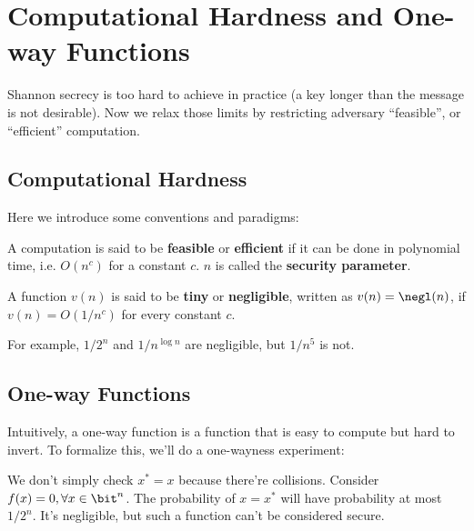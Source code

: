 \chapter{Computational Hardness and One-way Functions}

Shannon secrecy is too hard to achieve in practice (a key longer than the message is not desirable). Now we relax those limits by restricting adversary ``feasible'', or ``efficient'' computation.

\section{Computational Hardness}

Here we introduce some conventions and paradigms:

\begin{definition}
	A computation is said to be \textbf{feasible} or \textbf{efficient} if it can be done in polynomial time, i.e. $O(n^c)$ for a constant $c$.
	$n$ is called the \textbf{security parameter}.
\end{definition}

\begin{definition}
	A function $v(n)$ is said to be \textbf{tiny} or \textbf{negligible}, written as $v(n) = \negl(n)$, if $v(n) = O(1/n^c)$ for every constant $c$.
\end{definition}

For example, $1/2^n$ and $1/n^{\log n}$ are negligible, but $1/n^5$ is not.

\section{One-way Functions}

Intuitively, a one-way function is a function that is easy to compute but hard to invert. To formalize this, we'll do a one-wayness experiment:


\begin{remark}
	We don't simply check $x^* = x$ because there're collisions. Consider $f(x) = 0, \forall x\in\bit^n$. The probability of $x=x^*$ will have probability at most $1/2^n$. It's negligible, but such a function can't be considered secure.
\end{remark}

